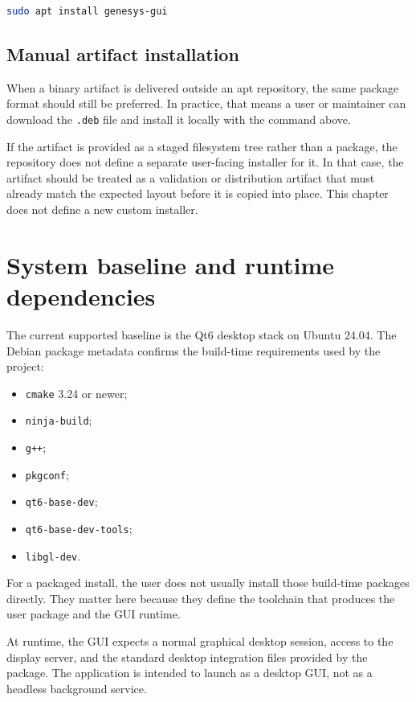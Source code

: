 \begin{lstlisting}[language=bash,caption={Installing GenESyS from a repository},label={lst:user-installation-repo-deb}]
sudo apt install genesys-gui
\end{lstlisting}

\subsection{Manual artifact installation}
\label{subsec:user-installation-manual-artifact}

When a binary artifact is delivered outside an apt repository, the same package
format should still be preferred. In practice, that means a user or maintainer
can download the \texttt{.deb} file and install it locally with the command
above.

If the artifact is provided as a staged filesystem tree rather than a package,
the repository does not define a separate user-facing installer for it. In that
case, the artifact should be treated as a validation or distribution artifact
that must already match the expected layout before it is copied into place.
This chapter does not define a new custom installer.

\section{System baseline and runtime dependencies}
\label{sec:user-installation-runtime-dependencies}

The current supported baseline is the Qt6 desktop stack on Ubuntu 24.04.
The Debian package metadata confirms the build-time requirements used by the
project:
\begin{itemize}
\item \texttt{cmake} 3.24 or newer;
\item \texttt{ninja-build};
\item \texttt{g++};
\item \texttt{pkgconf};
\item \texttt{qt6-base-dev};
\item \texttt{qt6-base-dev-tools};
\item \texttt{libgl-dev}.
\end{itemize}

For a packaged install, the user does not usually install those build-time
packages directly. They matter here because they define the toolchain that
produces the user package and the GUI runtime.

At runtime, the GUI expects a normal graphical desktop session, access to the
display server, and the standard desktop integration files provided by the
package. The application is intended to launch as a desktop GUI, not as a
headless background service.

